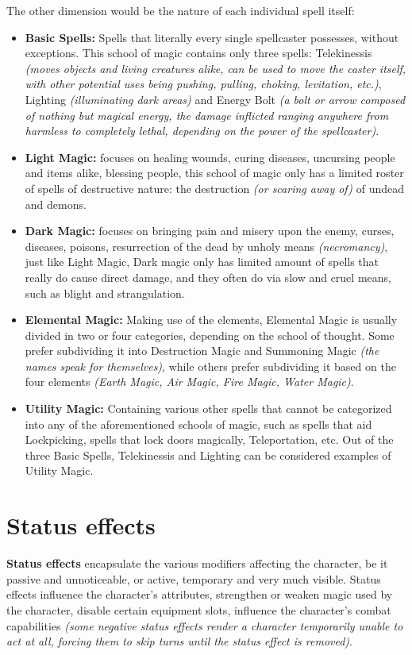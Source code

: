 \documentclass[tikz,openany,11pt,a4paper]{book}
\begin{document}
The other dimension would be the nature of each individual spell itself:
\begin{itemize}
\item \textbf{Basic Spells:} Spells that literally every single spellcaster possesses, without exceptions. This school of magic contains only three spells: Telekinessis \textit{(moves objects and living creatures alike, can be used to move the caster itself, with other potential uses being pushing, pulling, choking, levitation, etc.)}, Lighting \textit{(illuminating dark areas)} and Energy Bolt \textit{(a bolt or arrow composed of nothing but magical energy, the damage inflicted ranging anywhere from harmless to completely lethal, depending on the power of the spellcaster)}.
\item \textbf{Light Magic:} focuses on healing wounds, curing diseases, uncursing people and items alike, blessing people, this school of magic only has a limited roster of spells of destructive nature: the destruction \textit{(or scaring away of)} of undead and demons.
\item \textbf{Dark Magic:} focuses on bringing pain and misery upon the enemy, curses, diseases, poisons, resurrection of the dead by unholy means \textit{(necromancy)}, just like Light Magic, Dark magic only has limited amount of spells that really do cause direct damage, and they often do via slow and cruel means, such as blight and strangulation.
\item \textbf{Elemental Magic:} Making use of the elements, Elemental Magic is usually divided in two or four categories, depending on the school of thought. Some prefer subdividing it into Destruction Magic and Summoning Magic \textit{(the names speak for themselves)}, while others prefer subdividing it based on the four elements \textit{(Earth Magic, Air Magic, Fire Magic, Water Magic)}.
\item \textbf{Utility Magic:} Containing various other spells that cannot be categorized into any of the aforementioned schools of magic, such as spells that aid Lockpicking, spells that lock doors magically, Teleportation, etc. Out of the three Basic Spells, Telekinessis and Lighting can be considered examples of Utility Magic.
\end{itemize}
\section{Status effects}
\textbf{Status effects} encapsulate the various modifiers affecting the character, be it passive and unnoticeable, or active, temporary and very much visible. Status effects influence the character's attributes, strengthen or weaken magic used by the character, disable certain equipment slots, influence the character's combat capabilities \textit{(some negative status effects render a character temporarily unable to act at all, forcing them to skip turns until the status effect is removed)}.
\end{document}
